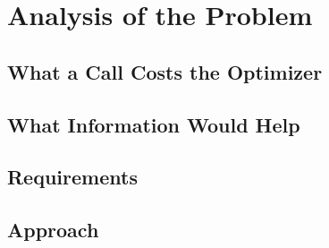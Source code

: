 \chapter{Analysis of the Problem}\label{chap:problem}

\section{What a Call Costs the Optimizer}\label{sec:problem-calls}

\section{What Information Would Help}\label{sec:problem-information}

\section{Requirements}\label{sec:problem-requirements}

\section{Approach}\label{sec:problem-approach}
